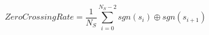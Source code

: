 \begin{displaymath}
\mathit{Zero Crossing Rate} = \frac{1}{N_S} \sum_{i=0}^{N_S-2} sgn(s_i) \oplus sgn(s_{i+1})
\label{eq:zero_crossing_rate}
\end{displaymath}
